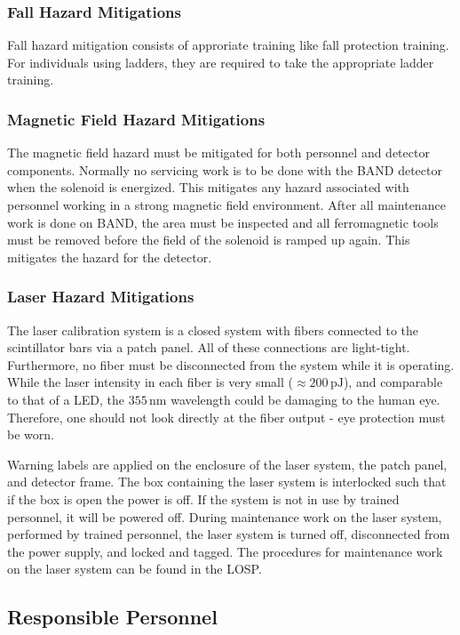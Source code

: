 \subsubsection{Fall Hazard Mitigations} 
Fall hazard mitigation consists of approriate training like fall protection training. For individuals using ladders, they are required to take the appropriate ladder training.

\subsubsection{Magnetic Field Hazard Mitigations}
The magnetic field hazard must be mitigated for both personnel and detector components. Normally no servicing work is to be done with the BAND detector when the solenoid is energized.
This mitigates any hazard associated with personnel working in a strong magnetic field environment. 
After all maintenance work is done on BAND, the area must be inspected and all ferromagnetic tools must be removed before the field of the solenoid is ramped up again. This mitigates the hazard for the detector. 

\subsubsection{Laser Hazard Mitigations}
The laser calibration system is a closed system with fibers connected to the scintillator bars via a patch panel. All of these connections are light-tight. Furthermore, no fiber must be disconnected from the system while it is operating. While the laser intensity in each fiber is very small ($\approx 200\,\mathrm{pJ}$), and comparable to that of a LED, the $355\,\mathrm{nm}$ wavelength could be damaging to the human eye. Therefore, one should not look directly at the fiber output - eye protection must be worn. 

Warning labels are applied on the enclosure of the laser system, the patch panel, and detector frame. The box containing the laser system is interlocked such that if the box is open the power is off. If the system is not in use by trained personnel, it will be powered off. During maintenance work on the laser system, performed by trained personnel, the laser system is turned off, disconnected from the power supply, and locked and tagged. The procedures for maintenance work on the laser system can be found in the LOSP.

\subsection{Responsible Personnel}
\indent

